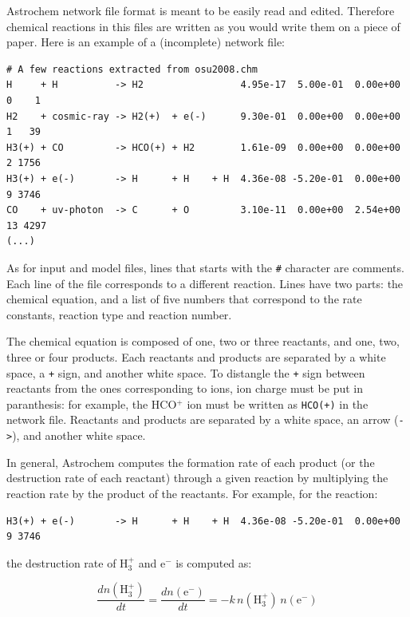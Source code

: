 \documentclass[a4paper,12pt]{article}
\newcommand{\conc}[1]{n(\mathrm{#1})}
\begin{document}
Astrochem network file format is meant to be easily read and
edited. Therefore chemical reactions in this files are written as you
would write them on a piece of paper. Here is an example of a
(incomplete) network file:

\begin{verbatim}
# A few reactions extracted from osu2008.chm
H     + H          -> H2                 4.95e-17  5.00e-01  0.00e+00  0    1
H2    + cosmic-ray -> H2(+)  + e(-)      9.30e-01  0.00e+00  0.00e+00  1   39
H3(+) + CO         -> HCO(+) + H2        1.61e-09  0.00e+00  0.00e+00  2 1756
H3(+) + e(-)       -> H      + H    + H  4.36e-08 -5.20e-01  0.00e+00  9 3746
CO    + uv-photon  -> C      + O         3.10e-11  0.00e+00  2.54e+00 13 4297
(...)
\end{verbatim}

As for input and model files, lines that starts with the \verb=#=
character are comments. Each line of the file corresponds to a
different reaction. Lines have two parts: the chemical equation, and a
list of five numbers that correspond to the rate constants, reaction
type and reaction number.

The chemical equation is composed of one, two or three reactants, and
one, two, three or four products. Each reactants and products are
separated by a white space, a \verb=+= sign, and another white
space. To distangle the \verb=+= sign between reactants from the ones
corresponding to ions, ion charge must be put in paranthesis: for
example, the HCO$^{+}$ ion must be written as \verb=HCO(+)= in the
network file. Reactants and products are separated by a white space,
an arrow (\verb=->=), and another white space.

In general, Astrochem computes the formation rate of each product (or
the destruction rate of each reactant) through a given reaction by
multiplying the reaction rate by the product of the reactants. For
example, for the reaction:

\begin{verbatim}
H3(+) + e(-)       -> H      + H    + H  4.36e-08 -5.20e-01  0.00e+00  9 3746
\end{verbatim}

\noindent
the destruction rate of H$_{3}^{+}$ and e$^{-}$ is computed as:

\begin{equation}
  \frac{d \conc{H_{3}^{+}}}{dt} = \frac{d \conc{e^{-}}}{dt} = - k \,
  \conc{H_{3}^{+}} \, \conc{e^{-}}
\end{equation}
\end{document}
